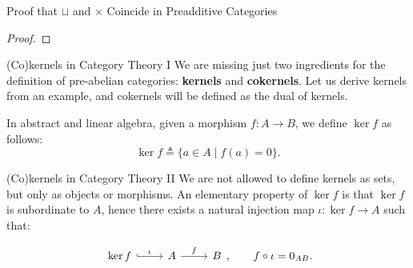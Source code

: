 \documentclass{beamer}
\begin{document}
\begin{frame}[fragile]{Proof that \texorpdfstring{$\sqcup$}{⊔} and \texorpdfstring{$\times$}{×} Coincide in Preadditive Categories}
\begin{proof}

    \end{proof}
\end{frame}

\begin{frame}{(Co)kernels in Category Theory I}
    We are missing just two ingredients for the definition of pre-abelian categories:
    \textbf{kernels} and \textbf{cokernels}. Let us derive kernels from an example,
    and cokernels will be defined as the dual of kernels. \medskip
    
    
    In abstract and linear algebra, given a morphism $f : A \to B$, we define $\ker f$ as follows:
    \[
        \ker f \triangleq \{ a \in A \mid f(a) = 0 \}.
    \]
\end{frame}

\begin{frame}{(Co)kernels in Category Theory II}
    We are not allowed to define kernels as sets, but only as objects or morphisms.
    An elementary property of $\ker f$ is that $\ker f$ is subordinate to $A$, hence
    there exists a natural injection map $\iota : \ker f \to A$ such that:

    \[\begin{tikzcd}[ampersand replacement=\&]
        {\ker f} \& A \& B
        \arrow["\iota", hook, from=1-1, to=1-2]
        \arrow["f", from=1-2, to=1-3]
    \end{tikzcd}, \qquad f \circ \iota = 0_{AB}. \]
\end{frame}
\end{document}
